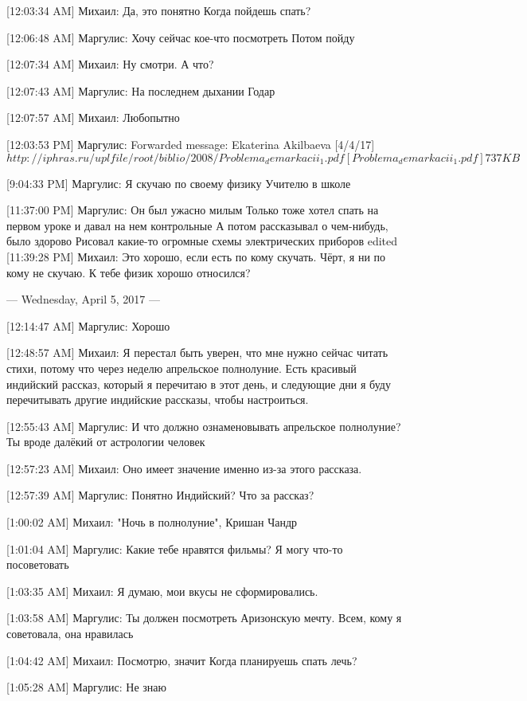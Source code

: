 \documentclass{article}
\begin{document}
[12:03:34 AM] Михаил:
Да, это понятно
 Когда пойдешь спать?

[12:06:48 AM] Маргулис:
Хочу сейчас кое-что посмотреть
 Потом пойду

[12:07:34 AM] Михаил:
Ну смотри. А что?

[12:07:43 AM] Маргулис:
На последнем дыхании
 Годар

[12:07:57 AM] Михаил:
Любопытно

[12:03:53 PM] Маргулис:
Forwarded message: 
Ekaterina Akilbaeva [4/4/17] 
$http://iphras.ru/uplfile/root/biblio/2008/Problema_demarkacii_1.pdf
[Problema_demarkacii_1.pdf] 737 KB$
 
[9:04:33 PM] Маргулис:
Я скучаю по своему физику
 Учителю в школе

[11:37:00 PM] Маргулис:
Он был ужасно милым
 Только тоже хотел спать на первом уроке и давал на нем контрольные
 А потом рассказывал о чем-нибудь, было здорово
 Рисовал какие-то огромные схемы электрических приборов
edited 
[11:39:28 PM] Михаил:
Это хорошо, если есть по кому скучать.
 Чёрт, я ни по кому не скучаю.
 К тебе физик хорошо относился?

--- Wednesday, April 5, 2017 ---

[12:14:47 AM] Маргулис:
Хорошо

[12:48:57 AM] Михаил:
Я перестал быть уверен, что мне нужно сейчас читать стихи, потому что через неделю апрельское полнолуние. Есть красивый индийский рассказ, который я перечитаю в этот день, и следующие дни я буду перечитывать другие индийские рассказы, чтобы настроиться.

[12:55:43 AM] Маргулис:
И что должно ознаменовывать апрельское полнолуние?
 Ты вроде далёкий от астрологии человек

[12:57:23 AM] Михаил:
Оно имеет значение именно из-за этого рассказа.

[12:57:39 AM] Маргулис:
Понятно
 Индийский?
 Что за рассказ?

[1:00:02 AM] Михаил:
"Ночь в полнолуние", Кришан Чандр

[1:01:04 AM] Маргулис:
Какие тебе нравятся фильмы?
 Я могу что-то посоветовать

[1:03:35 AM] Михаил:
Я думаю, мои вкусы не сформировались.

[1:03:58 AM] Маргулис:
Ты должен посмотреть Аризонскую мечту. Всем, кому я советовала, она нравилась

[1:04:42 AM] Михаил:
Посмотрю, значит
 Когда планируешь спать лечь?

[1:05:28 AM] Маргулис:
Не знаю
\end{document}
